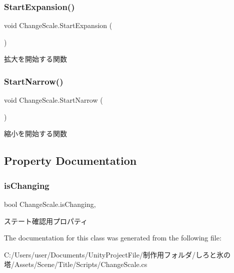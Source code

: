 \subsubsection{\texorpdfstring{Start\+Expansion()}{StartExpansion()}}
{\footnotesize\ttfamily void Change\+Scale.\+Start\+Expansion (\begin{DoxyParamCaption}{ }\end{DoxyParamCaption})\hspace{0.3cm}{\ttfamily [inline]}}



拡大を開始する関数 

\mbox{\label{class_change_scale_a4a306bcc12f9855028d8141966af3c09}} 
\subsubsection{\texorpdfstring{Start\+Narrow()}{StartNarrow()}}
{\footnotesize\ttfamily void Change\+Scale.\+Start\+Narrow (\begin{DoxyParamCaption}{ }\end{DoxyParamCaption})\hspace{0.3cm}{\ttfamily [inline]}}



縮小を開始する関数 



\subsection{Property Documentation}
\mbox{\label{class_change_scale_aaef648ca57bd63b7815e280a0cf58341}} 
\subsubsection{\texorpdfstring{is\+Changing}{isChanging}}
{\footnotesize\ttfamily bool Change\+Scale.\+is\+Changing\hspace{0.3cm}{\ttfamily [get]}, {}}



ステート確認用プロパティ 



The documentation for this class was generated from the following file\+:\begin{DoxyCompactItemize}
\item 
C\+:/\+Users/user/\+Documents/\+Unity\+Project\+File/制作用フォルダ/しろと氷の塔/\+Assets/\+Scene/\+Title/\+Scripts/Change\+Scale.\+cs\end{DoxyCompactItemize}
